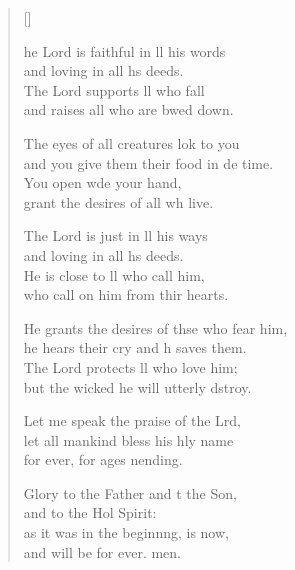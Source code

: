 \settowidth{\versewidth}{He grants the desires of those who fear him, *}
\begin{verse}[\versewidth]
  \begin{patverse}
he Lord is faithful in ll his words\Med\\
and loving in all h\pointup{\i}s deeds.\\
The Lord supports ll who fall\Med\\
and raises all who are bwed down.

The eyes of all creatures lok to you\Med\\
and you give them their food in de time.\\
You open w\pointup{\i}de your hand,\Med\\
grant the desires of all wh live.

The Lord is just in ll his ways\Med\\
and loving in all h\pointup{\i}s deeds.\\
He is close to ll who call him,\Med\\
who call on him from thir hearts.

He grants the desires of thse who fear him,\Med\\
he hears their cry and h saves them.\\
The Lord protects ll who love him;\Med\\
but the wicked he will utterly dstroy.

Let me speak the praise of the Lrd,\Flex\\
let all mankind bless his hly name\Med\\
for ever, for ages nending.

Glory to the Father and t the Son,\Med\\
and to the Hol Spirit:\\
as it was in the beginn\pointup{\i}ng, is now,\Med\\
and will be for ever. men.
  \end{patverse}
\end{verse}
